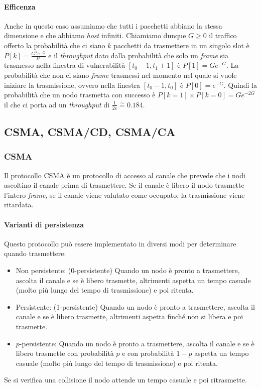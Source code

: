             \paragraph{Efficenza} Anche in questo caso assumiamo che tutti i pacchetti abbiano la stessa dimensione e che abbiamo \textit{host} infiniti. Chiamiamo dunque $G\geq 0$ il traffico offerto la probabilità che ci siano $k$ pacchetti da trasmettere in un singolo slot è $P[k]=\frac{G^ke^{-G}}{k!}$ e il \textit{throughput} dato dalla probabilità che solo un \textit{frame} sia trasmesso nella finestra di vulnerabilità $[t_0-1,t_1+1]$ è $P[1]=Ge^{-G}$. La probabilità che non ci siano \textit{frame} trasmessi nel momento nel quale si vuole iniziare la trasmissione, ovvero nella finestra $[t_0-1,t_0]$ è $P[0]=e^{-G}$. Quindi la probabilità che un nodo trasmetta con successo è $P[k=1]\times P[k=0]=Ge^{-2G}$ il che ci porta ad un \textit{throughput} di $\frac{1}{2e}\stackrel{\sim}{=}0.184$.
    \subsection[\texttt{CSMA}, \texttt{CSMA/CD}, \texttt{CSMA/CA}]{\Acrshort*{CSMA}, \Acrshort*{CSMA/CD}, \Acrshort*{CSMA/CA}}
        \subsubsection{\acrfull*{CSMA}}
            Il protocollo \Acrshort*{CSMA} è un protocollo di accesso al canale che prevede che i nodi ascoltino il canale prima di trasmettere. Se il canale è libero il nodo trasmette l'intero \textit{frame}, se il canale viene valutato come occupato, la trasmissione viene ritardata.
            \paragraph{Varianti di persistenza} Questo protocollo può essere implementato in diversi modi per determinare quando trasmettere:
            \begin{itemize}
                \item Non persistente: (0-persistente) Quando un nodo è pronto a trasmettere, ascolta il canale e se è libero trasmette, altrimenti aspetta un tempo casuale (molto più lungo del tempo di trasmissione) e poi ritenta.
                \item Persistente: (1-persistente) Quando un nodo è pronto a trasmettere, ascolta il canale e se è libero trasmette, altrimenti aspetta finché non si libera e poi trasmette.
                \item $p$-persistente: Quando un nodo è pronto a trasmettere, ascolta il canale e se è libero trasmette con probabilità $p$ e con probabilità $1-p$ aspetta un tempo casuale (molto più lungo del tempo di trasmissione) e poi ritenta.
            \end{itemize}
            Se si verifica una collisione il nodo attende un tempo casuale e poi ritrasmette.
